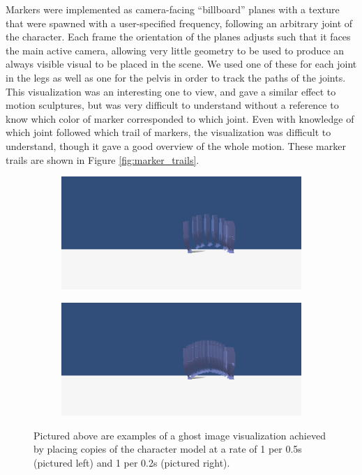 Markers were implemented as camera-facing ``billboard'' planes with a texture that were spawned with a user-specified frequency, following an arbitrary joint of the character.  Each frame the orientation of the planes adjusts such that it faces the main active camera, allowing very little geometry to be used to produce an always visible visual to be placed in the scene.  We used one of these for each joint in the legs as well as one for the pelvis in order to track the paths of the joints.  This visualization was an interesting one to view, and gave a similar effect to motion sculptures, but was very difficult to understand without a reference to know which color of marker corresponded to which joint.  Even with knowledge of which joint followed which trail of markers, the visualization was difficult to understand, though it gave a good overview of the whole motion.  These marker trails are shown in Figure \ref{fig:marker_trails}.

\begin{figure}[ht]
	\centering
	\begin{subfigure}[b]{0.49\textwidth}
		\includegraphics[width=\textwidth]{images/ghosts/side-sparse.png}
	\end{subfigure}
	\begin{subfigure}[b]{0.49\textwidth}
		\includegraphics[width=\textwidth]{images/ghosts/side-dense.png}
	\end{subfigure}
	\caption[Ghost image visualization]{Pictured above are examples of a ghost image visualization achieved by placing copies of the character model at a rate of 1 per 0.5s (pictured left) and 1 per 0.2s (pictured right).}
	\label{fig:ghost_vis}
\end{figure}

